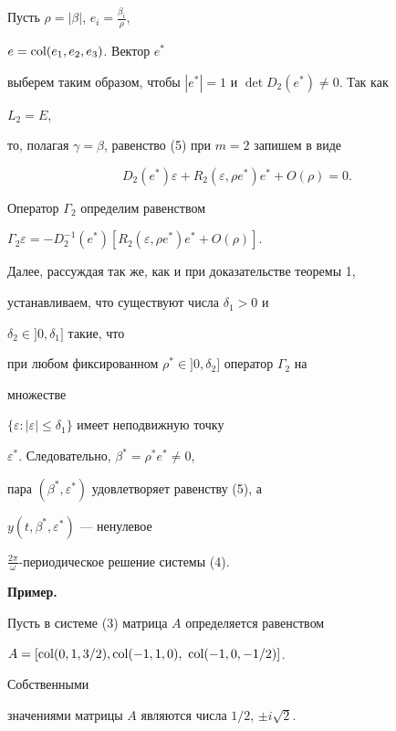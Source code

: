 \begin{pf} 


Пусть $\rho=|\beta|$, $e_i=\frac{\beta_i}{\rho}$, 


$e=\operatorname{col}(e_1,e_2,e_3)$. Вектор $e^*$ 


выберем таким образом, чтобы $|e^*|=1$ и $\det D_2(e^*)\ne 0$. Так как 


$L_2=E$, 


то, полагая $\gamma=\beta$, равенство (5) при $m=2$ запишем в виде 


$$ 


D_2(e^*)\varepsilon+R_2(\varepsilon,\rho e^*)e^*+ 


O(\rho)=0. 


$$ 


 


Оператор $\Gamma_2$ определим равенством 


$\Gamma_2\varepsilon=-D^{-1}_2(e^*)[R_2(\varepsilon,\rho e^*)e^*+ 


O(\rho)]$. 


Далее, рассуждая так же, как и при доказательстве теоремы 1, 


устанавливаем, что существуют числа $\delta_1>0$ и 


$\delta_2\in]0,\delta_1]$ такие, что 


при любом фиксированном $\rho^*\in]0,\delta_2]$ оператор $\Gamma_2$ на 


множестве 


$\{\varepsilon:|\varepsilon|\le\delta_1\}$ имеет неподвижную точку 


$\varepsilon^*$. Следовательно, $\beta^*=\rho^*e^*\ne 0$, 


пара $(\beta^*,\varepsilon^*)$ удовлетворяет равенству (5), а 


$y(t,\beta^*,\varepsilon^*)$ --- ненулевое 


$\frac{2\pi}{\omega}$-периодическое решение системы (4). 


\end{pf} 


 


{\bf Пример.} 


Пусть в системе (3) матрица $A$ определяется равенством 


$A=[\col(0,1,3/2),\linebreak \col(-1,1,0),\ \col(-1,0,-1/2)]$. 


Собственными 


значениями матрицы $A$ являются числа $1/2$, $\pm i\sqrt{2}$. 


